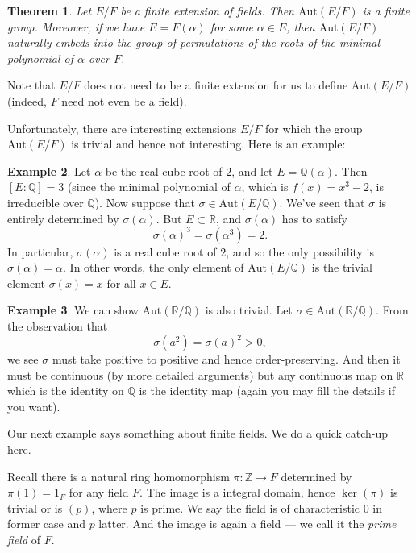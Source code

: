 \documentclass[12pt]{report}
\newtheorem{theorem}{Theorem}[section]
\theoremstyle{definition}
\newtheorem{example}[theorem]{Example}
\newcommand{\Aut}{\text{Aut}}
\newcommand{\ZZ}{\mathbb{Z}}
\newcommand{\QQ}{\mathbb{Q}}
\newcommand{\RR}{\mathbb{R}}
\begin{document}
\begin{theorem}
	Let $E/F$ be a finite extension of fields. Then $\Aut(E/F)$ is a finite group. Moreover, if we have $E = F(\alpha)$ for some $\alpha \in E$, then $\Aut(E/F)$ naturally embeds into the group of permutations of the roots of the minimal polynomial of $\alpha$ over $F$.
\end{theorem}

Note that $E/F$ does not need to be a finite extension for us to define $\Aut(E/F)$ (indeed, $F$ need not even be a field).

Unfortunately, there are interesting extensions $E/F$ for which the group $\Aut(E/F)$ is trivial and hence not interesting. Here is an example:

\begin{example}
	Let $\alpha$ be the real cube root of $2$, and let $E = \QQ(\alpha)$. Then $[E:\QQ] = 3$ (since the minimal polynomial of $\alpha$, which is $f(x) = x^3 - 2$, is irreducible over $\QQ$). Now suppose that $\sigma \in \Aut(E/\QQ)$. We've seen that $\sigma$ is entirely determined by $\sigma(\alpha)$. But $E \subset \RR$, and $\sigma(\alpha)$ has to satisfy $$\sigma(\alpha)^3 = \sigma(\alpha^3) = 2.$$
	In particular, $\sigma(\alpha)$ is a real cube root of $2$, and so the only possibility is $\sigma(\alpha) = \alpha$. In other words, the only element of $\Aut(E/\QQ)$ is the trivial element $\sigma(x) = x$ for all $x \in E$.
\end{example}

\begin{example}
	We can show $\Aut(\RR/\QQ)$ is also trivial. Let $\sigma\in \Aut(\RR/\QQ)$. From the observation that $$\sigma(a^2)=\sigma(a)^2 > 0,$$ we see $\sigma$ must take positive to positive and hence order-preserving. And then it must be continuous (by more detailed arguments) but any continuous map on $\RR$ which is the identity on $\QQ$ is the identity map (again you may fill the details if you want).
\end{example}

\noindent Our next example says something about finite fields. We do a quick catch-up here.

Recall there is a natural ring homomorphism $\pi:\ZZ\to F$ determined by $\pi(1)=1_F$ for any field $F$. The image is a integral domain, hence $\ker(\pi)$ is trivial or is $(p)$, where $p$ is prime. We say the field is of characteristic 0 in former case and $p$ latter. And the image is again a field --- we call it the \emph{prime field} of $F$.
\end{document}
